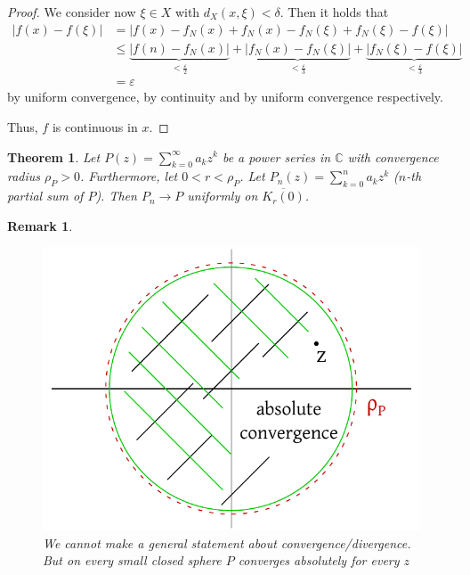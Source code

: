 \documentclass{article}
\newtheorem{theorem}{Theorem}  \numberwithin{theorem}{section}
\newtheorem{remark}{Remark}  \numberwithin{remark}{section}
\newcommand{\card}[1]{\left|#1\right|}
\begin{document}
\begin{proof}
  We consider now $\xi \in X$ with $d_X(x, \xi) < \delta$. Then it holds that
  \begin{align*}
    \card{f(x) - f(\xi)}
      &= \card{f(x) - f_N(x) + f_N(x) - f_N(\xi) + f_N(\xi) - f(\xi)} \\
      &\leq \underbrace{\card{f(n) - f_N(x)}}_{< \frac\varepsilon2} + \underbrace{\card{f_N(x) - f_N(\xi)}}_{< \frac\varepsilon3} + \underbrace{\card{f_N(\xi) - f(\xi)}}_{< \frac\varepsilon3} \\
      &= \varepsilon
  \end{align*}
  by uniform convergence, by continuity and by uniform convergence respectively.

  Thus, $f$ is continuous in $x$.
\end{proof}

\begin{theorem} %
  Let $P(z) = \sum_{k=0}^\infty a_k z^k$ be a power series in $\mathbb C$ with convergence radius $\rho_P > 0$.
  Furthermore, let $0 < r < \rho_P$.
  Let $P_n(z) = \sum_{k=0}^n a_k z^k$ ($n$-th partial sum of $P$).
  Then $P_n \to P$ uniformly on $\overline{K_r(0)}$.
\end{theorem}

\begin{remark}
  \begin{figure}[t]
    \begin{center}
      \includegraphics{img/26_uniform_convergence.pdf}
      \caption{We cannot make a general statement about convergence/divergence. But on every small closed sphere $P$ converges absolutely for every $z$}
      \label{img:uconv}
    \end{center}
  \end{figure}
\end{remark}
\end{document}
